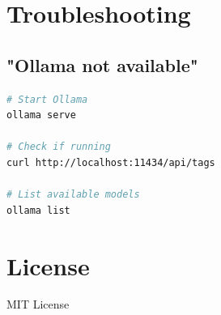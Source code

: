 \documentclass[11pt,a4paper]{article}
\begin{document}
\section{Troubleshooting}

\subsection{"Ollama not available"}

\begin{lstlisting}[language=bash]
# Start Ollama
ollama serve

# Check if running
curl http://localhost:11434/api/tags

# List available models
ollama list
\end{lstlisting}

\section{License}

MIT License
\end{document}

